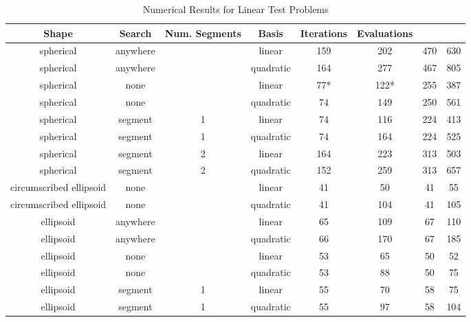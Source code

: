 
\tiny
\begin{center}
\begin{longtable}{ c c c c c c c c }
\caption{Numerical Results for Linear Test Problems} \\
\label{linear_pathological_results}
Shape & Search & Num. Segments & Basis & Iterations & Evaluations \\
\hline
                spherical &   anywhere &       &     linear & 159  &   202  &  470 &  630 \\
                spherical &   anywhere &       &  quadratic & 164  &   277  &  467 &  805 \\
                spherical &       none &       &     linear &  77* &   122* &  255 &  387 \\
                spherical &       none &       &  quadratic &  74  &   149  &  250 &  561 \\
                spherical &    segment &     1 &     linear &  74  &   116  &  224 &  413 \\
                spherical &    segment &     1 &  quadratic &  74  &   164  &  224 &  525 \\
                spherical &    segment &     2 &     linear & 164  &   223  &  313 &  503 \\
                spherical &    segment &     2 &  quadratic & 152  &   259  &  313 &  657 \\
  circumscribed ellipsoid &       none &       &     linear &  41  &    50  &   41 &   55 \\
  circumscribed ellipsoid &       none &       &  quadratic &  41  &   104  &   41 &  105 \\
                ellipsoid &   anywhere &       &     linear &  65  &   109  &   67 &  110 \\
                ellipsoid &   anywhere &       &  quadratic &  66  &   170  &   67 &  185 \\
                ellipsoid &       none &       &     linear &  53  &    65  &   50 &   52 \\
                ellipsoid &       none &       &  quadratic &  53  &    88  &   50 &   75 \\
                ellipsoid &    segment &     1 &     linear &  55  &    70  &   58 &   75 \\
                ellipsoid &    segment &     1 &  quadratic &  55  &    97  &   58 &  104 \\

\end{longtable}
\end{center}
